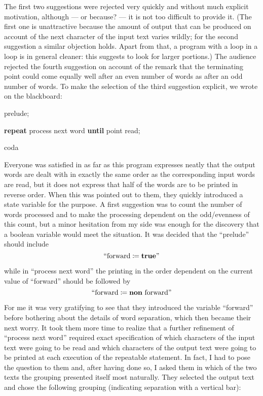 The first two suggestions were rejected very quickly and without much explicit motivation, although --- or because? --- it is not too difficult to provide it. (The first one is unattractive because the amount of output that can be produced on account of the next character of the input text varies wildly; for the second suggestion a similar objection holds. Apart from that, a program with a loop in a loop is in general cleaner: this suggests to look for larger portions.) The audience rejected the fourth suggestion on account of the remark that the terminating point could come equally well after an even number of words as after an odd number of words. To make the selection of the third suggestion explicit, we wrote on the blackboard:

\quad prelude;

\quad \textbf{repeat} process next word \textbf{until} point read;

\quad coda

Everyone was satisfied in as far as this program expresses neatly that the output words are dealt with in exactly the same order as the corresponding input words are read, but it does not express that half of the words are to be printed in reverse order. When this was pointed out to them, they quickly introduced a state variable for the purpose. A first suggestion was to count the number of words processed and to make the processing dependent on the odd/evenness of this count, but a minor hesitation from my side was enough for the discovery that a boolean variable would meet the situation. It was decided that the ``prelude'' should include
$$
\text{``forward} \coloneq \text{\textbf{true}''}
$$

\noindent
while in ``process next word'' the printing in the order dependent on the current value of ``forward'' should be followed by
$$
\text{``forward} \coloneq \text{\textbf{non} forward''}
$$

For me it was very gratifying to see that they introduced the variable ``forward'' before bothering about the details of word separation, which then became their next worry. It took them more time to realize that a further refinement of ``process next word'' required exact specification of which characters of the input text were going to be read and which characters of the output text were going to be printed at each execution of the repeatable statement. In fact, I had to pose the question to them and, after having done so, I asked them in which of the two texts the grouping presented itself most naturally. They selected the output text and chose the following grouping (indicating separation with a vertical bar):

